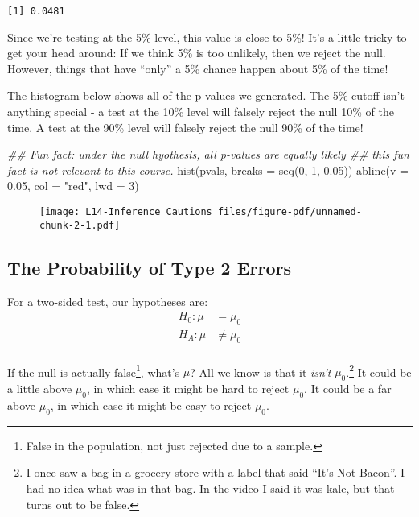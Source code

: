 \documentclass[
  letterpaper,
  DIV=11,
  numbers=noendperiod]{scrreprt}
\newenvironment{Shaded}{\begin{snugshade}}{\end{snugshade}}
\newcommand{\AttributeTok}[1]{\textcolor[rgb]{0.40,0.45,0.13}{#1}}
\newcommand{\DecValTok}[1]{\textcolor[rgb]{0.68,0.00,0.00}{#1}}
\newcommand{\DocumentationTok}[1]{\textcolor[rgb]{0.37,0.37,0.37}{\textit{#1}}}
\newcommand{\FloatTok}[1]{\textcolor[rgb]{0.68,0.00,0.00}{#1}}
\newcommand{\FunctionTok}[1]{\textcolor[rgb]{0.28,0.35,0.67}{#1}}
\newcommand{\NormalTok}[1]{\textcolor[rgb]{0.00,0.23,0.31}{#1}}
\newcommand{\StringTok}[1]{\textcolor[rgb]{0.13,0.47,0.30}{#1}}
\begin{document}
\begin{verbatim}
[1] 0.0481
\end{verbatim}

Since we're testing at the 5\% level, this value is close to 5\%! It's a
little tricky to get your head around: If we think 5\% is too unlikely,
then we reject the null. However, things that have ``only'' a 5\% chance
happen about 5\% of the time!

The histogram below shows all of the p-values we generated. The 5\%
cutoff isn't anything special - a test at the 10\% level will falsely
reject the null 10\% of the time. A test at the 90\% level will falsely
reject the null 90\% of the time!

\begin{Shaded}
\begin{Highlighting}[]
\DocumentationTok{\#\# Fun fact: under the null hyothesis, all p{-}values are equally likely}
\DocumentationTok{\#\# this fun fact is not relevant to this course.}
\FunctionTok{hist}\NormalTok{(pvals, }\AttributeTok{breaks =} \FunctionTok{seq}\NormalTok{(}\DecValTok{0}\NormalTok{, }\DecValTok{1}\NormalTok{, }\FloatTok{0.05}\NormalTok{))}
\FunctionTok{abline}\NormalTok{(}\AttributeTok{v =} \FloatTok{0.05}\NormalTok{, }\AttributeTok{col =} \StringTok{"red"}\NormalTok{, }\AttributeTok{lwd =} \DecValTok{3}\NormalTok{)}
\end{Highlighting}
\end{Shaded}

\begin{figure}[H]

{\centering \texttt{[image: L14-Inference\_Cautions\_files/figure-pdf/unnamed-chunk-2-1.pdf]}

}

\end{figure}

\hypertarget{the-probability-of-type-2-errors}{%
\subsection{The Probability of Type 2
Errors}\label{the-probability-of-type-2-errors}}

For a two-sided test, our hypotheses are: \begin{align*}
H_0: \mu &= \mu_0\\
H_A: \mu &\ne \mu_0\\
\end{align*}

If the null is actually false\footnote{False in the population, not just
  rejected due to a sample.}, what's \(\mu\)? All we know is that it
\emph{isn't} \(\mu_0\).\footnote{I once saw a bag in a grocery store
  with a label that said ``It's Not Bacon''. I had no idea what was in
  that bag. In the video I said it was kale, but that turns out to be
  false.} It could be a little above \(\mu_0\), in which case it might
be hard to reject \(\mu_0\). It could be a far above \(\mu_0\), in which
case it might be easy to reject \(\mu_0\).
\end{document}
